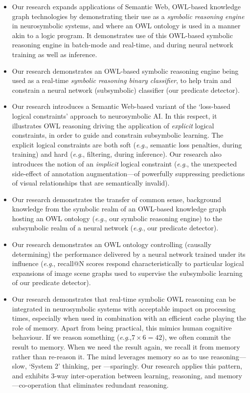 \documentclass[]{jair}
\newcommand{\eg}{\textit{e}.\textit{g}.,\xspace}
\begin{document}
\begin{itemize}
    \item Our research expands applications of Semantic Web, OWL-based knowledge graph technologies by demonstrating their use as a \emph{symbolic reasoning engine} in neurosymbolic systems, and where an OWL ontology is used in a manner akin to a logic program. It demonstrates use of this OWL-based symbolic reasoning engine in batch-mode and real-time, and during neural network training as well as inference.
    \item Our research demonstrates an OWL-based symbolic reasoning engine being used as a real-time \emph{symbolic reasoning binary classifier}, to help train and constrain a neural network (subsymbolic) classifier (our predicate detector).
    \item Our research introduces a Semantic Web-based variant of the `loss-based logical constraints' approach to neurosymbolic AI. In this respect, it illustrates OWL reasoning driving the application of \emph{explicit} logical constraints, in order to guide and constrain subsymbolic learning. The explicit logical constraints are both soft (\eg semantic loss penalties, during training) and hard (\eg filtering, during inference). Our research also introduces the notion of an \emph{implicit} logical constraint (\eg the unexpected side-effect of annotation augmentation---of powerfully suppressing predictions of visual relationships that are semantically invalid). 
    \item Our research demonstrates the transfer of common sense, background knowledge from the symbolic realm of an OWL-based knowledge graph hosting an OWL ontology (\eg our symbolic reasoning engine) to the subsymbolic realm of a neural network (\eg our predicate detector).
    \item Our research demonstrates an OWL ontology controlling (causally determining) the performance delivered by a neural network trained under its influence (\eg recall@N scores respond characteristically to particular logical expansions of image scene graphs used to supervise the subsymbolic learning of our predicate detector).
    \item Our research demonstrates that real-time symbolic OWL reasoning can be integrated in neurosymbolic systems with acceptable impact on processing times, especially when used in combination with an efficient cache playing the role of memory.  Apart from being practical, this mimics human cognitive behaviour. If we reason something (\eg $7 \times 6 = 42$), we often commit the result to memory. When we need the result again, we recall it from memory rather than re-reason it. The mind leverages memory so as to use reasoning---slow, `System 2' thinking, per \citet{Kahneman2011}---sparingly.  Our research applies this pattern, and exhibits 3-way inter-operation between learning, reasoning, and memory---co-operation that eliminates redundant reasoning.
\end{itemize}
\end{document}
